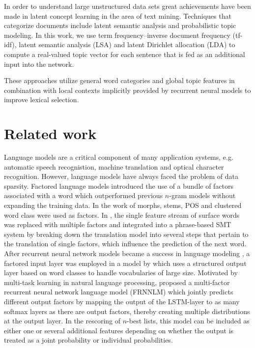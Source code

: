 \documentclass[a4paper]{article}
\begin{document}
In order to understand large unstructured data sets great achievements have been made in latent concept learning in the area of text mining. Techniques that categorize documents include latent semantic analysis and probabilistic topic modeling. In this work, we use term frequency–inverse document frequency (tf-idf), latent semantic analysis (LSA) and latent Dirichlet allocation (LDA) to compute a real-valued topic vector for each sentence that is fed as an additional input into the network. 

These approaches utilize general word categories and global topic features in combination with local contexts implicitly provided by recurrent neural models to improve lexical selection. 


\section{Related work}
Language models are a critical component of many application systems, e.g. automatic speech recognistion, machine translation and optical character recognition. However, language models have always faced the problem of data sparsity. Factored language models \cite{bilmes2003factored} introduced the use of a bundle of factors associated with a word which outperformed previous $n$-gram models without expanding the training data. In the work of \cite{bilmes2003factored} morphs, stems, POS and clustered word class were used as factors. In \cite{koehn2007factored}, the single feature stream of surface words was replaced with multiple factors and integrated into a phrase-based SMT system by breaking down the translation model into several steps that pertain to the translation of single factors, which influence the prediction of the next word.
After recurrent neural network models became a success in language modeling \cite{mikolov2010recurrent}, a factored input layer was employed in a model by \cite{wu2012factored} which uses a structured output layer based on word classes to handle vocabularies of large size.
Motivated by multi-task learning in natural language processing, \cite{niehuesusing} proposed a multi-factor recurrent neural network language model (FRNNLM) which jointly predicts different output factors by mapping the output of the LSTM-layer \cite{hochreiter1997long} to as many softmax layers as there are output factors, thereby creating multiple distributions at the output layer. In the rescoring of $n$-best lists, this model can be included as either one or several additional features depending on whether the output is treated as a joint probability or individual probabilities.
\end{document}
